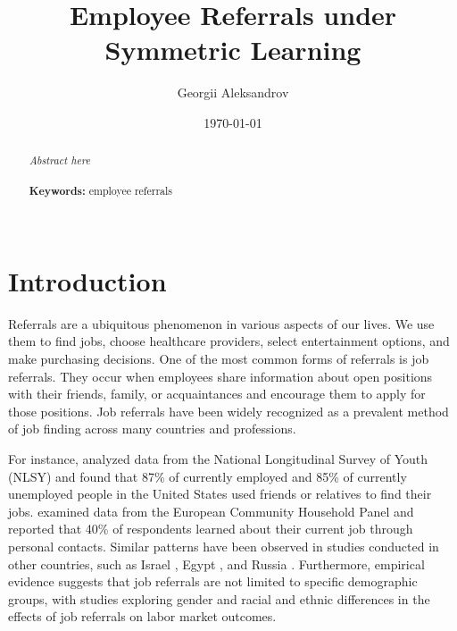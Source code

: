 \documentclass[12pt]{article}
\begin{document}
\begin{titlepage}
\title{Employee Referrals under Symmetric Learning}%
\author{Georgii Aleksandrov}%
\date{\today}
\maketitle
\begin{abstract}
\noindent \textit{Abstract here}\\
\vspace{0in}\\
\noindent\textbf{Keywords:} employee referrals\\
\vspace{0in}\\

\bigskip
\end{abstract}
\setcounter{page}{0}
\thispagestyle{empty}
\end{titlepage}
\pagebreak \newpage




\doublespacing


\section{Introduction} \label{sec:introduction}
Referrals are a ubiquitous phenomenon in various aspects of our lives. We use them to find jobs, choose healthcare providers, select entertainment options, and make purchasing decisions. One of the most common forms of referrals is job referrals. They occur when employees share information about open positions with their friends, family, or acquaintances and encourage them to apply for those positions. Job referrals have been widely recognized as a prevalent method of job finding across many countries and professions. 

For instance, \cite{holzer1987job} analyzed data from the National Longitudinal Survey of Youth (NLSY) and found that 87\% of currently employed and 85\% of currently unemployed people in the United States used friends or relatives to find their jobs. \cite{pellizzari2010friends} examined data from the European Community Household Panel and reported that 40\% of respondents learned about their current job through personal contacts. Similar patterns have been observed in studies conducted in other countries, such as Israel \citep{alon1997job}, Egypt \citep{wahba2005density}, and Russia \citep{yakubovich2005weak}. Furthermore, empirical evidence suggests that job referrals are not limited to specific demographic groups, with studies exploring gender \citep{corcoran1980most, morrison1990women, lalanne2016old} and racial and ethnic differences \citep{datcher1983impact, green1999racial, loury2006some} in the effects of job referrals on labor market outcomes.
\end{document}
